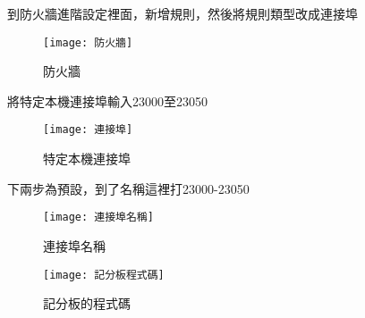 \begin{center}
到防火牆進階設定裡面，新增規則，然後將規則類型改成連接埠
\end{center}

\begin{figure}[hbt!]
\begin{center}
\texttt{[image: 防火牆]}
\caption{\Large 防火牆}\label{fig.防火牆}
\end{center}
\end{figure}

\begin{center}
將特定本機連接埠輸入23000至23050
\end{center}

\begin{figure}[hbt!]
\begin{center}
\texttt{[image: 連接埠]}
\caption{\Large 特定本機連接埠}\label{fig.連接埠}
\end{center}
\end{figure}

\begin{center}
下兩步為預設，到了名稱這裡打23000-23050
\end{center}

\begin{figure}[hbt!]
\begin{center}
\texttt{[image: 連接埠名稱]}
\caption{\Large 連接埠名稱}\label{fig.連接埠名稱}
\end{center}
\end{figure}
\newpage


\begin{figure}[hbt!]
\begin{center}
\texttt{[image: 記分板程式碼]}
\caption{\Large 記分板的程式碼}\label{fig.記分板程式碼}
\end{center}
\end{figure}
\newpage